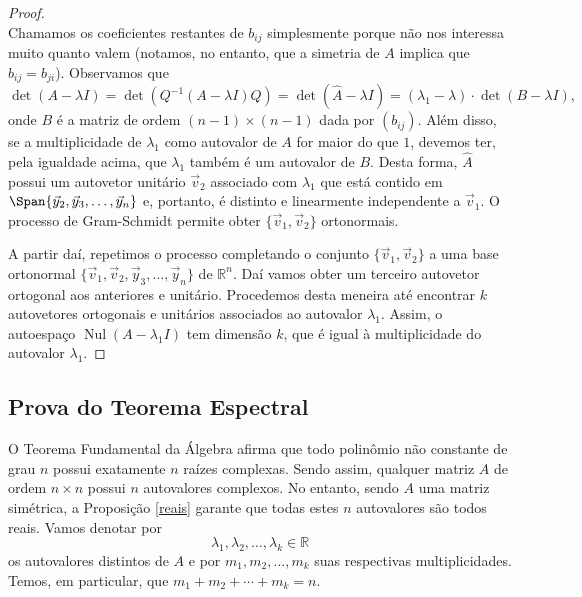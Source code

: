 \begin{proof}
\begin{equation}
	\end{equation} Chamamos os coeficientes restantes de $b_{ij}$ simplesmente porque não nos interessa muito quanto valem (notamos, no entanto, que a simetria de $A$ implica que $b_{ij} = b_{ji}$). Observamos que
	\begin{equation}
	\det \left( A - \lambda I \right) = \det \left( Q^{-1} (A - \lambda I) Q \right) =	\det \left( \hat{A} - \lambda I \right) = (\lambda_1 - \lambda) \cdot \det (B - \lambda I),
	\end{equation} onde $B$ é a matriz de ordem $(n-1)\times (n-1)$ dada por $(b_{ij})$. Além disso, se a multiplicidade de $\lambda_1$ como autovalor de $A$ for maior do que $1$, devemos ter, pela igualdade acima, que $\lambda_1$ também é um autovalor de $B$. Desta forma, $\hat{A}$ possui um autovetor unitário $\vec{v}_2$ associado com $\lambda_1$ que está contido em $\Span \{ \vec{y}_2, \vec{y}_3, \dots, \vec{y}_n \}$ e, portanto, é distinto e linearmente independente a $\vec{v}_1$. O processo de Gram-Schmidt permite obter $\{\vec{v}_1, \vec{v}_2\}$ ortonormais.

	A partir daí, repetimos o processo completando o conjunto $\{\vec{v}_1, \vec{v}_2\}$ a uma base ortonormal $\{ \vec{v}_1, \vec{v}_2, \vec{y}_3, \dots, \vec{y}_n \}$ de $\mathbb{R}^n$. Daí vamos obter um terceiro autovetor ortogonal aos anteriores e unitário. Procedemos desta meneira até encontrar $k$ autovetores ortogonais e unitários associados ao autovalor $\lambda_1$. Assim, o autoespaço $\operatorname{Nul} (A - \lambda_1 I)$ tem dimensão $k$, que é igual à multiplicidade do autovalor $\lambda_1$.
\end{proof}

\subsection{Prova do Teorema Espectral}

O Teorema Fundamental da Álgebra afirma que todo polinômio não constante de grau $n$ possui exatamente $n$ raízes complexas. Sendo assim, qualquer matriz $A$ de ordem $n\times n$ possui $n$ autovalores complexos. No entanto, sendo $A$ uma matriz simétrica, a Proposição \ref{reais} garante que todas estes $n$ autovalores são todos reais. Vamos denotar por
\begin{equation}
\lambda_1, \lambda_2, \dots, \lambda_k \in \mathbb{R}
\end{equation} os autovalores distintos de $A$ e por $m_1, m_2, \dots, m_k$ suas respectivas multiplicidades. Temos, em particular, que $m_1 + m_2 + \cdots + m_k = n$.

